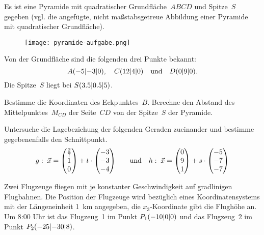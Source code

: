 \documentclass[12pt]{../exam2e}
\begin{document}
\begin{questions}
\begin{question}[7]
	Es ist eine Pyramide mit quadratischer Grundfläche~$ABCD$ und Spitze~$S$ gegeben (vgl. die angefügte, nicht maßstabsgetreue Abbildung einer Pyramide mit quadratischer Grundfläche).
\begin{figure}
	\texttt{[image: pyramide-aufgabe.png]}
\end{figure}

\noindent Von der Grundfläche sind die folgenden drei Punkte bekannt:
\begin{equation*}
	A\coords(-5,-3,0), 	\quad
	C\coords(12,4,0) 	\quad\text{und}\quad
	D\coords(0,9,0).
\end{equation*}
Die Spitze~$S$ liegt bei $S\coords(\num{3.5}, \num{.5}, 5)$.
\begin{subparts}
	\subpart Bestimme die Koordinaten des Eckpunktes~$B$.%
	\subpart Berechne den Abstand des Mittelpunktes~$M_{CD}$ der Seite~$CD$ von der Spitze~$S$ der Pyramide.
\end{subparts}
\end{question}
\omitsolution










\begin{question}[7]
Untersuche die Lagebeziehung der folgenden Geraden zueinander und bestimme gegebenenfalls den Schnittpunkt.
	\begin{equation*}
		g:\;\vec{x} = \vector(\frac27,1,0) + t\cdot \vector(-3,-3,-4)
		\qquad\text{und}\quad
		h:\;\vec{x} = \vector(0,9,1) + s \cdot \vector(-5,-7,-7)
	\end{equation*}
\end{question}








\begin{question}[19]
Zwei Flugzeuge fliegen mit je konstanter Geschwindigkeit auf gradlinigen Flugbahnen. Die Position der Flugzeuge wird bezüglich eines Koordinatensystems mit der Längeneinheit \qty{1}{\km} angegeben, die $x_3$-Koordinate gibt die Flughöhe an. 
Um 8:00 Uhr ist das Flugzeug~1 im Punkt $P_1\coords(-10,0,0)$
und das Flugzeug~2 im Punkt $P_2\coords(-25,-30,8)$. 


\end{question}
\end{questions}
\end{document}
